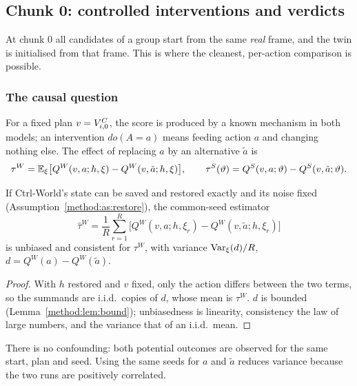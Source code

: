 \subsection{Chunk 0: controlled interventions and verdicts}\label{method:sec:chunk0}
At chunk 0 all candidates of a group start from the same \emph{real} frame, and the twin is initialised from that frame. This is where the cleanest, per-action comparison is possible.

\subsubsection{The causal question}
For a fixed plan $v=V^{C}_{i,0}$, the score is produced by a known mechanism in both models; an intervention $do(A=a)$ means feeding action $a$ and changing nothing else. The effect of replacing $a$ by an alternative $\tilde a$ is
\begin{equation}\label{method:eq:tau}
\tau^W=\mathbb{E}_{\xi}\big[Q^W(v,a;h,\xi)-Q^W(v,\tilde a;h,\xi)\big],\qquad
\tau^S(\vartheta)=Q^S(v,a;\vartheta)-Q^S(v,\tilde a;\vartheta).
\end{equation}
\begin{proposition}\label{method:prop:ident}
If Ctrl-World's state can be saved and restored exactly and its noise fixed (Assumption~\ref{method:as:restore}), the common-seed estimator
\[\hat\tau^W=\frac1R\sum_{r=1}^{R}\big[Q^W(v,a;h,\xi_r)-Q^W(v,\tilde a;h,\xi_r)\big]\]
is unbiased and consistent for $\tau^W$, with variance $\operatorname{Var}_\xi(d)/R$, $d=Q^W(a)-Q^W(\tilde a)$.
\end{proposition}
\begin{proof}
With $h$ restored and $v$ fixed, only the action differs between the two terms, so the summands are i.i.d.\ copies of $d$, whose mean is $\tau^W$. $d$ is bounded (Lemma~\ref{method:lem:bound}); unbiasedness is linearity, consistency the law of large numbers, and the variance that of an i.i.d.\ mean.
\end{proof}
There is no confounding: both potential outcomes are observed for the same start, plan and seed. Using the same seeds for $a$ and $\tilde a$ reduces variance because the two runs are positively correlated.


